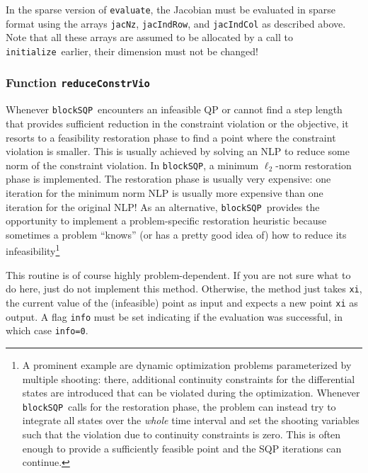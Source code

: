 \documentclass[	11pt,
				a4paper,
				abstract=true,
				twoside=true,
				bibliography=totoc, 
				headinclude=true,
				footinclude=false]{scrartcl}
\newcommand{\blockSQP}{\texttt{blockSQP}}
\newcommand{\init}{\texttt{initialize}}
\newcommand{\evaluate}{\texttt{evaluate}}
\newcommand{\reduce}{\texttt{reduceConstrVio}}
\begin{document}
In the sparse version of \evaluate, the Jacobian must be evaluated in sparse format using the arrays \texttt{jacNz}, \texttt{jacIndRow}, and \texttt{jacIndCol} as described above. Note that all these arrays are assumed to be allocated by a call to \init\ earlier, their dimension must not be changed!

\subsubsection{Function \reduce}
Whenever \blockSQP\ encounters an infeasible QP or cannot find a step length that provides sufficient reduction in the constraint violation or the objective, it resorts to a feasibility restoration phase to find a point where the constraint violation is smaller. This is usually achieved by solving an NLP to reduce some norm of the constraint violation. In \blockSQP, a minimum $\ell_{2}$-norm restoration phase is implemented. The restoration phase is usually very expensive: one iteration for the minimum norm NLP is usually more expensive than one iteration for the original NLP! As an alternative, \blockSQP\ provides the opportunity to implement a problem-specific restoration heuristic because sometimes a problem ``knows'' (or has a pretty good idea of) how to reduce its infeasibility\footnote{A prominent example are dynamic optimization problems parameterized by multiple shooting: there, additional continuity constraints for the differential states are introduced that can be violated during the optimization. Whenever \blockSQP\ calls for the restoration phase, the problem can instead try to integrate all states over the \emph{whole} time interval and set the shooting variables such that the violation due to continuity constraints is zero. This is often enough to provide a sufficiently feasible point and the SQP iterations can continue.}

This routine is of course highly problem-dependent. If you are not sure what to do here, just do not implement this method. Otherwise, the method just takes \texttt{xi}, the current value of the (infeasible) point as input and expects a new point \texttt{xi} as output. A flag \texttt{info} must be set indicating if the evaluation was successful, in which case \texttt{info=0}.

\end{document}
